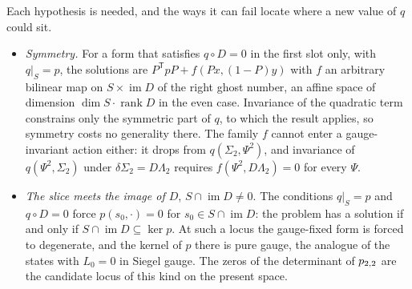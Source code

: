 Each hypothesis is needed, and the ways it can fail locate where a new value of $q$ could sit.
\begin{itemize}
  \setlength{\itemsep}{1ex}

  \item \emph{Symmetry.} For a form that satisfies $q \circ D = 0$ in the first slot only, with $q|_S = p$, the solutions are $P^{\mathsf T} p P + f(P x, (1 - P) y)$ with $f$ an arbitrary bilinear map on $S \times \operatorname{im} D$ of the right ghost number, an affine space of dimension $\dim S \cdot \operatorname{rank} D$ in the even case.
    Invariance of the quadratic term constrains only the symmetric part of $q$, to which the result applies, so symmetry costs no generality there.
    The family $f$ cannot enter a gauge-invariant action either: it drops from $q(\Sigma_2, \Psi^2)$, and invariance of $q(\Psi^2, \Sigma_2)$ under $\delta \Sigma_2 = D \Lambda_2$ requires $f(\Psi^2, D \Lambda_2) = 0$ for every $\Psi$.

  \item \emph{The slice meets the image of $D$}, $S \cap \operatorname{im} D \neq 0$.
    The conditions $q|_S = p$ and $q \circ D = 0$ force $p(s_0, \cdot) = 0$ for $s_0 \in S \cap \operatorname{im} D$: the problem has a solution if and only if $S \cap \operatorname{im} D \subseteq \ker p$.
    At such a locus the gauge-fixed form is forced to degenerate, and the kernel of $p$ there is pure gauge, the analogue of the states with $L_0 = 0$ in Siegel gauge.
    The zeros of the determinant of $p_{2,2}$ are the candidate locus of this kind on the present space.


\end{itemize}
